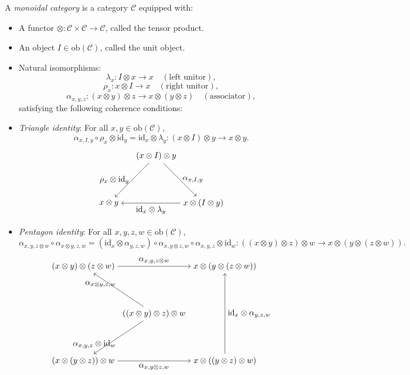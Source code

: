\documentclass{article}
\begin{document}
\begin{definition}
A \emph{monoidal category} is a category $\mathcal{C}$ equipped with:
\begin{itemize}
    \item A functor $\otimes : \mathcal{C} \times \mathcal{C} \to \mathcal{C}$, called the tensor product.
    \item An object $I \in \mathrm{ob}(\mathcal{C})$, called the unit object.
    \item Natural isomorphisms:
    \[
    \lambda_x : I \otimes x \to x \quad (\text{left unitor}),
    \]
    \[
    \rho_x : x \otimes I \to x \quad (\text{right unitor}),
    \]
    \[
    \alpha_{x,y,z} : (x \otimes y) \otimes z \to x \otimes (y \otimes z) \quad (\text{associator}),
    \]
    satisfying the following coherence conditions:
    \item \emph{Triangle identity}: For all $x, y \in \mathrm{ob}(\mathcal{C})$,
    \[
    \alpha_{x,I,y} \circ \rho_x \otimes \mathrm{id}_y = \mathrm{id}_x \otimes \lambda_y : (x \otimes I) \otimes y \to x \otimes y.
    \]
    \[
    \begin{tikzpicture}
        \node (top) at (0,2) {$(x \otimes I) \otimes y$};
        \node (left) at (-2,0) {$x \otimes y$};
        \node (right) at (2,0) {$x \otimes (I \otimes y)$};
        \draw[->] (top) to node[left] {$\rho_x \otimes \mathrm{id}_y$} (left);
        \draw[->] (top) to node[right] {$\alpha_{x,I,y}$} (right);
        \draw[->] (right) to node[below] {$\mathrm{id}_x \otimes \lambda_y$} (left);
    \end{tikzpicture}
    \]
    \item \emph{Pentagon identity}: For all $x, y, z, w \in \mathrm{ob}(\mathcal{C})$,
    \[
    \alpha_{x,y,z \otimes w} \circ \alpha_{x \otimes y,z,w} = (\mathrm{id}_x \otimes \alpha_{y,z,w}) \circ \alpha_{x,y \otimes z,w} \circ \alpha_{x,y,z} \otimes \mathrm{id}_w : ((x \otimes y) \otimes z) \otimes w \to x \otimes (y \otimes (z \otimes w)).
    \]
    \[
    \begin{tikzpicture}
        \node (center) at (0,0) {$((x \otimes y) \otimes z) \otimes w$};
        \node (topleft) at (-3,2) {$(x \otimes y) \otimes (z \otimes w)$};
        \node (topright) at (3,2) {$x \otimes (y \otimes (z \otimes w))$};
        \node (bottomleft) at (-3,-2) {$(x \otimes (y \otimes z)) \otimes w$};
        \node (bottomright) at (3,-2) {$x \otimes ((y \otimes z) \otimes w)$};
        \draw[->] (center) to node[above left] {$\alpha_{x \otimes y,z,w}$} (topleft);
        \draw[->] (center) to node[below left] {$\alpha_{x,y,z} \otimes \mathrm{id}_w$} (bottomleft);
        \draw[->] (topleft) to node[above] {$\alpha_{x,y,z \otimes w}$} (topright);
        \draw[->] (bottomleft) to node[below] {$\alpha_{x,y \otimes z,w}$} (bottomright);
        \draw[->] (bottomright) to node[right] {$\mathrm{id}_x \otimes \alpha_{y,z,w}$} (topright);
    \end{tikzpicture}
    \]
\end{itemize}
\end{definition}
\end{document}

